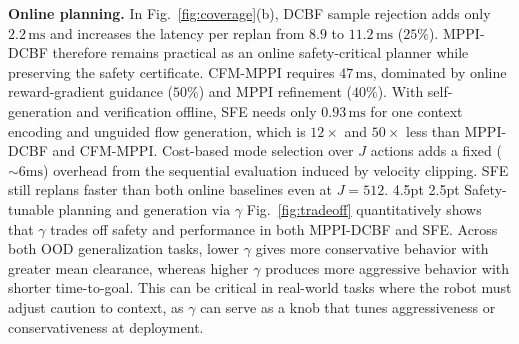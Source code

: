 \documentclass[letterpaper, 10 pt, conference]{ieeeconf}
\makeatletter
\renewcommand{\subsection}{%
  \@startsection{subsection}{2}{\z@}%
  {4.5pt}%
  {2.5pt}%
  {\normalfont\normalsize\itshape}}
\makeatother
\begin{document}
\noindent \textbf{Online planning.}
\label{sec:compute}
In Fig.~\ref{fig:coverage}(b), DCBF sample rejection adds only \(2.2\,\mathrm{ms}\) and increases the latency per replan from \(8.9\) to \(11.2\,\mathrm{ms}\) (\(25\%\)). MPPI-DCBF therefore remains practical as an online safety-critical planner while preserving the safety certificate.
CFM-MPPI requires \(47\,\mathrm{ms}\), dominated by online reward-gradient guidance (\(50\%\)) and MPPI refinement (\(40\%\)).
With self-generation and verification offline, SFE needs only \(0.93\,\mathrm{ms}\) for one context encoding and unguided flow generation, which is \(12\times\) and \(50\times\) less than MPPI-DCBF and CFM-MPPI.
Cost-based mode selection over \(J\) actions adds a fixed (\(\sim 6\mathrm{ms}\)) overhead from the sequential evaluation induced by velocity clipping. 
SFE still replans faster than both online baselines even at $J=512$.
\subsection{Safety-tunable planning and generation via $\gamma$}
\label{sec:tradeoff}
Fig.~\ref{fig:tradeoff} quantitatively shows that $\gamma$ trades off safety and performance in both MPPI-DCBF and SFE. Across both OOD generalization tasks, lower $\gamma$ gives more conservative behavior with greater mean clearance, whereas higher $\gamma$ produces more aggressive behavior with shorter time-to-goal. This can be critical in real-world tasks where the robot must adjust caution to context, as $\gamma$ can serve as a knob that tunes aggressiveness or conservativeness at deployment.
\end{document}
